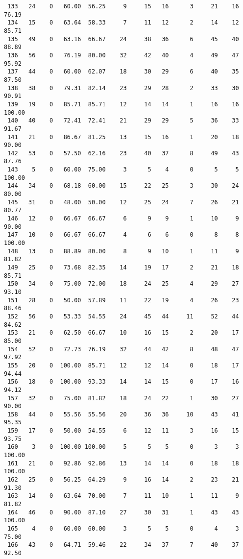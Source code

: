 \begin{verbatim}
 133   24    0   60.00  56.25     9     15   16      3     21    16    76.19
 134   15    0   63.64  58.33     7     11   12      2     14    12    85.71
 135   49    0   63.16  66.67    24     38   36      6     45    40    88.89
 136   56    0   76.19  80.00    32     42   40      4     49    47    95.92
 137   44    0   60.00  62.07    18     30   29      6     40    35    87.50
 138   38    0   79.31  82.14    23     29   28      2     33    30    90.91
 139   19    0   85.71  85.71    12     14   14      1     16    16   100.00
 140   40    0   72.41  72.41    21     29   29      5     36    33    91.67
 141   21    0   86.67  81.25    13     15   16      1     20    18    90.00
 142   53    0   57.50  62.16    23     40   37      8     49    43    87.76
 143    5    0   60.00  75.00     3      5    4      0      5     5   100.00
 144   34    0   68.18  60.00    15     22   25      3     30    24    80.00
 145   31    0   48.00  50.00    12     25   24      7     26    21    80.77
 146   12    0   66.67  66.67     6      9    9      1     10     9    90.00
 147   10    0   66.67  66.67     4      6    6      0      8     8   100.00
 148   13    0   88.89  80.00     8      9   10      1     11     9    81.82
 149   25    0   73.68  82.35    14     19   17      2     21    18    85.71
 150   34    0   75.00  72.00    18     24   25      4     29    27    93.10
 151   28    0   50.00  57.89    11     22   19      4     26    23    88.46
 152   56    0   53.33  54.55    24     45   44     11     52    44    84.62
 153   21    0   62.50  66.67    10     16   15      2     20    17    85.00
 154   52    0   72.73  76.19    32     44   42      8     48    47    97.92
 155   20    0  100.00  85.71    12     12   14      0     18    17    94.44
 156   18    0  100.00  93.33    14     14   15      0     17    16    94.12
 157   32    0   75.00  81.82    18     24   22      1     30    27    90.00
 158   44    0   55.56  55.56    20     36   36     10     43    41    95.35
 159   17    0   50.00  54.55     6     12   11      3     16    15    93.75
 160    3    0  100.00 100.00     5      5    5      0      3     3   100.00
 161   21    0   92.86  92.86    13     14   14      0     18    18   100.00
 162   25    0   56.25  64.29     9     16   14      2     23    21    91.30
 163   14    0   63.64  70.00     7     11   10      1     11     9    81.82
 164   46    0   90.00  87.10    27     30   31      1     43    43   100.00
 165    4    0   60.00  60.00     3      5    5      0      4     3    75.00
 166   43    0   64.71  59.46    22     34   37      7     40    37    92.50

\end{verbatim}
